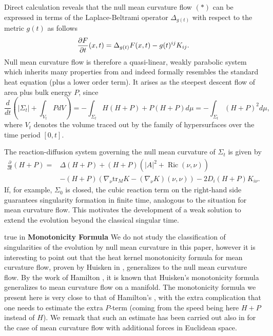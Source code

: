 \documentclass[11pt]{amsart}
\DeclareMathOperator{\Ric}{Ric}    \DeclareMathOperator{\Rm}{Rm}
\begin{document}
Direct calculation reveals that the null mean curvature flow $(*)$ can be expressed in terms of the Laplace-Beltrami operator $\Delta_{g(t)}$ with respect to the metric $g(t)$ as follows 
\begin{equation*}
 \frac{\partial F}{\partial t}(x,t) = \Delta_{g(t)}F(x,t)-g(t)^{ij}K_{ij}.\\
\end{equation*}
Null mean curvature flow is therefore a quasi-linear, weakly parabolic system which inherits many properties from and indeed formally resembles the standard heat equation (plus a lower order term). It arises as the steepest descent flow of area plus bulk energy $P$, since
\begin{equation*}
\frac{d}{dt}\left(|\Sigma_t|+\int_{V_t}P dV\right)=-\int_{\Sigma_t} H(H+P) + P(H+P)d\mu=-\int_{\Sigma_t} (H+P)^2 d\mu, 
\end{equation*}
where $V_t$ denotes the volume traced out by the family of hypersurfaces over the time period $[0,t]$. 

The reaction-diffusion system governing the null mean curvature of $\Sigma_t$ is given by
\begin{equation}\label{heH+P}
\begin{split}\frac{\partial}{\partial t}(H+P)=&\Delta(H+P)+(H+P)(|A|^2+\Ric(\nu,\nu))\\
&-(H+P)(\nabla_{\nu}\text{tr}_MK-(\nabla_{\nu}K)(\nu,\nu))-2D_i(H+P)K_{i\nu}.
\end{split}
\end{equation}
If, for example, $\Sigma_0$ is closed, the cubic reaction term on the right-hand side guarantees singularity formation in finite time, analogous to the situation for mean curvature flow. This motivates the development of a weak solution to extend the evolution beyond the classical singular time.



 true in
\textbf{Monotonicity Formula}
We do not study the classification of singularities of the evolution by null mean curvature in this paper, however it is interesting to point out that the heat kernel monotonicity formula for mean curvature flow, proven by Huisken in \cite{Hu90}, generalizes to the null mean curvature flow. By the work of Hamilton \cite{Ha1}, it is known that Huisken's monotonicity formula generalizes to mean curvature flow on a manifold. The monotonicity formula we present here is very close to that of  Hamilton's \cite{Ha1}, with the extra complication that one needs to estimate the extra $P$-term (coming from the speed being here $H+P$ instead of $H$). We remark that such an estimate has been carried out also in \cite{W96} for the case of mean curvature flow with additional forces in Euclidean space.
\end{document}
